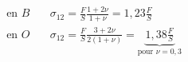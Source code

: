 \begin{displaymath}
    \begin{aligned}
        \text{en } B & \quad \sigma_{12} = \frac{F}{S} \frac{1+2\nu}{1+\nu} = 1,23 \frac{F}{S} \\
        \text{en } O & \quad \sigma_{12} = \frac{F}{S} \frac{3+2\nu}{2(1+\nu)} = \underbrace{1,38 \frac{F}{S}}_{\text{pour } \nu = 0,3}
    \end{aligned}
\end{displaymath}
